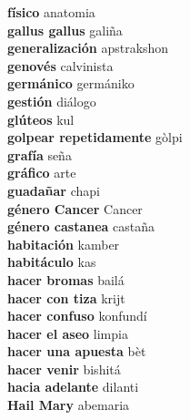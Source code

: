 \textbf{ físico  } anatomia \\
\textbf{ gallus gallus  } galiña \\
\textbf{ generalización  } apstrakshon \\
\textbf{ genovés  } calvinista \\
\textbf{ germánico  } germániko \\
\textbf{ gestión  } diálogo \\
\textbf{ glúteos  } kul \\
\textbf{ golpear repetidamente  } gòlpi \\
\textbf{ grafía  } seña \\
\textbf{ gráfico  } arte \\
\textbf{ guadañar  } chapi \\
\textbf{ género Cancer  } Cancer \\
\textbf{ género castanea  } castaña \\
\textbf{ habitación  } kamber \\
\textbf{ habitáculo  } kas \\
\textbf{ hacer bromas  } bailá \\
\textbf{ hacer con tiza  } krijt \\
\textbf{ hacer confuso  } konfundí \\
\textbf{ hacer el aseo  } limpia \\
\textbf{ hacer una apuesta  } bèt \\
\textbf{ hacer venir  } bishitá \\
\textbf{ hacia adelante  } dilanti \\
\textbf{ Hail Mary  } abemaria \\
